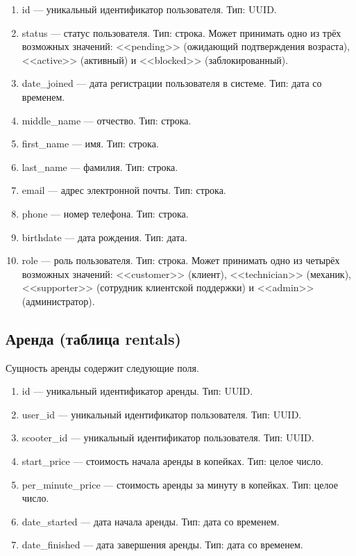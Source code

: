 \begin{enumerate}
    \item id --- уникальный идентификатор пользователя. Тип: UUID.
    \item status --- статус пользователя. Тип: строка. Может принимать одно из трёх возможных значений: <<pending>> (ожидающий подтверждения возраста), <<active>> (активный) и <<blocked>> (заблокированный).
    \item date\_joined --- дата регистрации пользователя в системе. Тип: дата со временем.
    \item middle\_name --- отчество. Тип: строка.
    \item first\_name --- имя. Тип: строка.
    \item last\_name --- фамилия. Тип: строка.
    \item email --- адрес электронной почты. Тип: строка.
    \item phone --- номер телефона. Тип: строка.
    \item birthdate --- дата рождения. Тип: дата.
    \item role --- роль пользователя. Тип: строка. Может принимать одно из четырёх возможных значений: <<customer>> (клиент), <<technician>> (механик), <<supporter>> (сотрудник клиентской поддержки) и <<admin>> (администратор).
\end{enumerate}

\subsection{Аренда (таблица rentals)}

Сущность аренды содержит следующие поля.

\begin{enumerate}
    \item id --- уникальный идентификатор аренды. Тип: UUID.
    \item user\_id --- уникальный идентификатор пользователя. Тип: UUID.
    \item scooter\_id --- уникальный идентификатор пользователя. Тип: UUID.
    \item start\_price --- стоимость начала аренды в копейках. Тип: целое число.
    \item per\_minute\_price --- стоимость аренды за минуту в копейках. Тип: целое число.
    \item date\_started --- дата начала аренды. Тип: дата со временем.
    \item date\_finished --- дата завершения аренды. Тип: дата со временем.
\end{enumerate}

